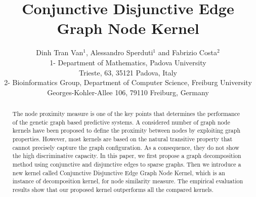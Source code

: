 \documentclass{esannV2}
\begin{document}
\title{Conjunctive Disjunctive Edge \\Graph Node Kernel}

\author{Dinh Tran Van$^1$, Alessandro Sperduti$^1$ and Fabrizio Costa$^2$
%
%
\vspace{.3cm}\\
%
1- Department of Mathematics, Padova University\\
Trieste, 63, 35121 Padova, Italy
%
\vspace{.1cm}\\
2- Bioinformatics Group, Department of Computer Science, Freiburg University \\
Georges-Kohler-Allee 106, 79110 Freiburg, Germany\\
}

\maketitle

\begin{abstract}\noindent The node proximity measure is one of the key points that determines the performance of the genetic graph based predictive systems. A considered number of graph node kernels have been proposed to define the proximity between nodes by exploiting graph properties. However, most kernels are based on the natural transitive property that cannot precisely capture the graph configuration. As a consequence, they do not show the high discriminative capacity. In this paper, we first propose a graph decomposition method using conjunctive and disjunctive edges to sparse graphs. Then we introduce a new kernel called Conjunctive Disjunctive Edge Graph Node Kernel, which is an instance of decomposition kernel, for node similarity measure. The empirical evaluation results show that our proposed kernel outperforms all the compared kernels.
\end{abstract}
\end{document}
